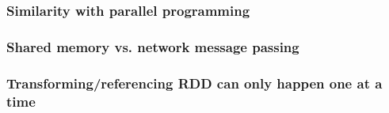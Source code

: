 \subsubsection{Similarity with parallel programming}
\subsubsection{Shared memory vs. network message passing}
\subsubsection{Transforming/referencing RDD can only happen one at a time}

